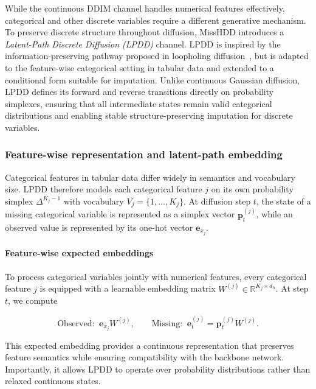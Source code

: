 \documentclass[times, review, 10pt]{elsarticle}
\begin{document}
While the continuous DDIM channel handles numerical features effectively,
categorical and other discrete variables require a different generative
mechanism. To preserve discrete structure throughout diffusion, MissHDD
introduces a \emph{Latent-Path Discrete Diffusion (LPDD)} channel. LPDD is
inspired by the information-preserving pathway proposed in loopholing
diffusion~\cite{loopholing}, but is adapted to the feature-wise categorical
setting in tabular data and extended to a conditional form suitable for
imputation. Unlike continuous Gaussian diffusion, LPDD defines its forward
and reverse transitions directly on probability simplexes, ensuring that all
intermediate states remain valid categorical distributions and enabling
stable structure-preserving imputation for discrete variables.





\subsubsection{Feature-wise representation and latent-path embedding}

Categorical features in tabular data differ widely in semantics and vocabulary
size. LPDD therefore models each categorical feature $j$ on its own probability
simplex $\Delta^{K_j-1}$ with vocabulary $V_j=\{1,\dots,K_j\}$. At diffusion
step $t$, the state of a missing categorical variable is represented as a
simplex vector $\mathbf{p}_t^{(j)}$, while an observed value is represented by
its one-hot vector $\mathbf{e}_{x_j}$.

\paragraph{Feature-wise expected embeddings}
To process categorical variables jointly with numerical features, every
categorical feature $j$ is equipped with a learnable embedding matrix
$W^{(j)}\in\mathbb{R}^{K_j\times d_h}$. At step $t$, we compute

\begin{equation}
\text{Observed:}\;\; \mathbf{e}_{x_j}W^{(j)}, \qquad
    \text{Missing:}\;\; \mathbf{e}^{(j)}_t = \mathbf{p}_t^{(j)}W^{(j)}.
\end{equation}


This expected embedding provides a continuous representation that preserves
feature semantics while ensuring compatibility with the backbone network.
Importantly, it allows LPDD to operate over probability distributions rather
than relaxed continuous states.
\end{document}

